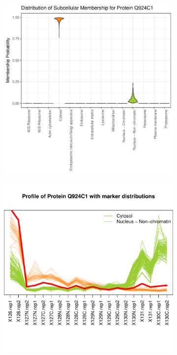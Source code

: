 \documentclass[12pt,english]{article}
\begin{document}
\begin{figure}[h]
  \centering
  \begin{subfigure}[t]{0.5\textwidth}
    \centering
\includegraphics{tagm-015}
    \caption{}
  \end{subfigure}%
  \begin{subfigure}[t]{0.5\textwidth}
    \centering
\includegraphics{tagm-016}

\end{subfigure}
\end{figure}
\end{document}
